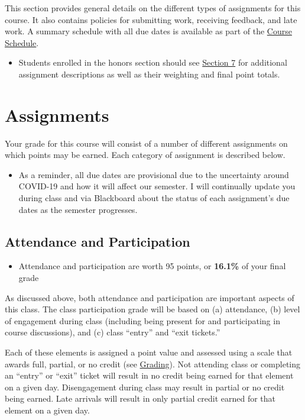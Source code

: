 \documentclass[
]{book}
\newenvironment{rmdblock}[1]
  {\begin{shaded*}
  \begin{itemize}
  \renewcommand{\labelitemi}{
    \raisebox{-.7\height}[0pt][0pt]{
      {\setkeys{Gin}{width=3em,keepaspectratio}\texttt{[image: images/\#1]}}
    }
  }
  \item
  }
  {
  \end{itemize}
  \end{shaded*}
  }
\newenvironment{rmdtip}
  {\begin{rmdblock}{tip}}
  {\end{rmdblock}}
\newenvironment{rmdwarning}
  {\begin{rmdblock}{warning}}
  {\end{rmdblock}}
\begin{document}
This section provides general details on the different types of assignments for this course. It also contains policies for submitting work, receiving feedback, and late work. A summary schedule with all due dates is available as part of the \href{course-schedule.html}{Course Schedule}.

\begin{rmdwarning}
Students enrolled in the honors section should see
\href{/syllabus/honors-overview.html}{Section 7} for additional
assignment descriptions as well as their weighting and final point
totals.
\end{rmdwarning}

\hypertarget{assignments}{%
\section{Assignments}\label{assignments}}

Your grade for this course will consist of a number of different assignments on which points may be earned. Each category of assignment is described below.

\begin{rmdwarning}
As a reminder, all due dates are provisional due to the uncertainty
around COVID-19 and how it will affect our semester. I will continually
update you during class and via Blackboard about the status of each
assignment's due dates as the semester progresses.
\end{rmdwarning}

\hypertarget{attendance-and-participation-1}{%
\subsection{Attendance and Participation}\label{attendance-and-participation-1}}

\begin{rmdtip}
Attendance and participation are worth 95 points, or \textbf{16.1\%} of
your final grade
\end{rmdtip}

As discussed above, both attendance and participation are important aspects of this class. The class participation grade will be based on (a) attendance, (b) level of engagement during class (including being present for and participating in course discussions), and (c) class ``entry'' and ``exit tickets.''

Each of these elements is assigned a point value and assessed using a scale that awards full, partial, or no credit (see \href{grading.html}{Grading}). Not attending class or completing an ``entry'' or ``exit'' ticket will result in no credit being earned for that element on a given day. Disengagement during class may result in partial or no credit being earned. Late arrivals will result in only partial credit earned for that element on a given day.
\end{document}
